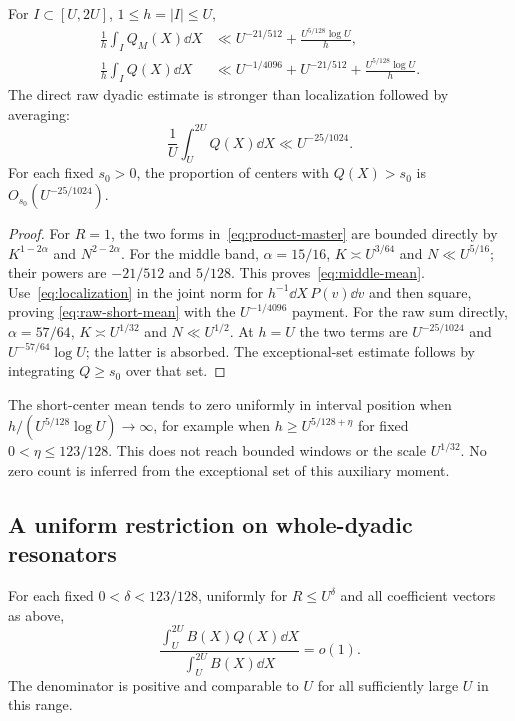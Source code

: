 \begin{theorem}\label{thm:means}
For $I\subset[U,2U]$, $1\le h=|I|\le U$,
\begin{align}
 \frac1h\int_I Q_M(X)\dd X
 &\ll U^{-21/512}+\frac{U^{5/128}\log U}{h},\label{eq:middle-mean}\\
 \frac1h\int_I Q(X)\dd X
 &\ll U^{-1/4096}+U^{-21/512}
                        +\frac{U^{5/128}\log U}{h}.\label{eq:raw-short-mean}
\end{align}
The direct raw dyadic estimate is stronger than localization followed
by averaging:
\begin{equation}\label{eq:raw-dyadic}
 \frac1U\int_U^{2U}Q(X)\dd X\ll U^{-25/1024}.
\end{equation}
For each fixed $s_0>0$, the proportion of centers with $Q(X)>s_0$
is $O_{s_0}(U^{-25/1024})$.
\end{theorem}

\begin{proof}
For $R=1$, the two forms in~\eqref{eq:product-master} are bounded
directly by $K^{1-2\alpha}$ and $N^{2-2\alpha}$.
For the middle band, $\alpha=15/16$, $K\asymp U^{3/64}$ and
$N\ll U^{5/16}$; their powers are $-21/512$ and $5/128$.
This proves~\eqref{eq:middle-mean}.
Use~\eqref{eq:localization} in the joint norm for
$h^{-1}\dd X\,P(v)\dd v$ and then square, proving
\eqref{eq:raw-short-mean} with the $U^{-1/4096}$ payment.
For the raw sum directly, $\alpha=57/64$, $K\asymp U^{1/32}$ and
$N\ll U^{1/2}$. At $h=U$ the two terms are
$U^{-25/1024}$ and $U^{-57/64}\log U$; the latter is absorbed.
The exceptional-set estimate follows by integrating $Q\ge s_0$
over that set.
\end{proof}

The short-center mean tends to zero uniformly in interval position
when $h/(U^{5/128}\log U)\to\infty$, for example when
$h\ge U^{5/128+\eta}$ for fixed $0<\eta\le123/128$.
This does not reach bounded windows or the scale $U^{1/32}$.
No zero count is inferred from the exceptional set of this auxiliary
moment.

\subsection{A uniform restriction on whole-dyadic resonators}

\begin{theorem}\label{thm:resonator}
For each fixed $0<\delta<123/128$, uniformly for $R\le U^\delta$
and all coefficient vectors as above,
\begin{equation}\label{eq:resonator-limit}
 \frac{\int_U^{2U}B(X)Q(X)\dd X}
      {\int_U^{2U}B(X)\dd X}=o(1).
\end{equation}
The denominator is positive and comparable to $U$ for all sufficiently
large $U$ in this range.
\end{theorem}

